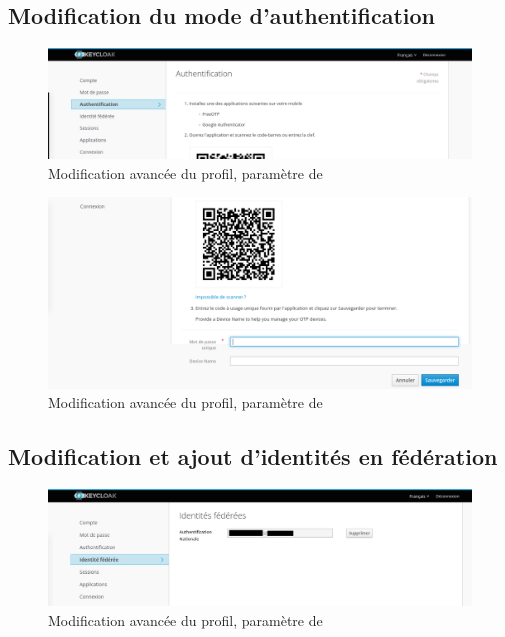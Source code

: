 \subsection{Modification du mode d'authentification}
\begin{figure}
	\centering
	\includegraphics{./Captures/keycloack.profil.authentification.haut.png}
	\caption{Modification avancée du profil, paramètre de }
\end{figure}

\begin{figure}
	\centering
	\includegraphics{./Captures/keycloack.profil.authentification.bas.png}
	\caption{Modification avancée du profil, paramètre de }
\end{figure}

\subsection{Modification et ajout d'identités en fédération}
\begin{figure}
	\centering
	\includegraphics{./Captures/keycloack.profil.identite.federee.png}
	\caption{Modification avancée du profil, paramètre de }
\end{figure}

